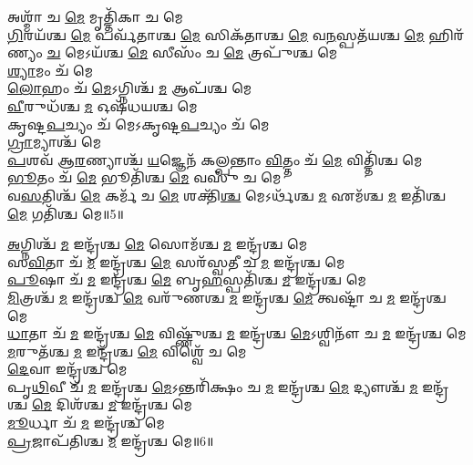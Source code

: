 𑌅𑌶𑍍𑌮𑌾᳴ 𑌚 \ul{𑌮𑍇} 𑌮𑍃𑌤𑍍𑌤𑌿᳴𑌕𑌾 𑌚 𑌮𑍇\\
\-\ul{𑌗𑌿}\-𑌰𑌯᳴𑌶𑍍𑌚 \ul{𑌮𑍇} 𑌪𑌰𑍍𑌵᳴𑌤𑌾𑌶𑍍𑌚 \ul{𑌮𑍇} 𑌸𑌿𑌕᳴𑌤𑌾𑌶𑍍𑌚 \ul{𑌮𑍇} 𑌵\-\ul{𑌨}\-𑌸𑍍𑌪𑌤᳴𑌯𑌶𑍍𑌚 \ul{𑌮𑍇} 𑌹𑌿𑌰᳴𑌣𑍍𑌯𑌂 \ul{𑌚} 𑌮𑍇𑌽𑌯᳴𑌶𑍍𑌚 \ul{𑌮𑍇} 𑌸𑍀𑌸𑌂᳴ 𑌚 \ul{𑌮𑍇} 𑌤𑍍𑌰𑌪𑍁᳴𑌶𑍍𑌚 𑌮𑍇\\
\-\ul{𑌶𑍍𑌯𑌾}\-𑌮𑌂 𑌚᳴ 𑌮𑍇\\
\-\ul{𑌲𑍋}\-𑌹𑌂 𑌚᳴ \ul{𑌮𑍇}\-𑌽𑌗𑍍𑌨𑌿𑌶𑍍𑌚᳴ \ul{𑌮} 𑌆𑌪᳴𑌶𑍍𑌚 𑌮𑍇\\
\-\ul{𑌵𑍀}\-𑌰𑍁𑌧᳴𑌶𑍍𑌚 \ul{𑌮} 𑌓𑌷᳴𑌧𑌯𑌶𑍍𑌚 𑌮𑍇\\
𑌕𑍃𑌷𑍍𑌟\-\ul{𑌪}\-𑌚𑍍𑌯𑌂 𑌚᳴ 𑌮𑍇𑌽𑌕𑍃𑌷𑍍𑌟\-\ul{𑌪}\-𑌚𑍍𑌯𑌂 𑌚᳴ 𑌮𑍇\\
\-\ul{𑌗𑍍𑌰𑌾}\-𑌮𑍍𑌯𑌾𑌶𑍍𑌚᳴ 𑌮𑍇\\
\-\ul{𑌪}\-𑌶𑌵᳴ 𑌆\-\ul{𑌰}\-𑌣𑍍𑌯𑌾𑌶𑍍𑌚᳴ \ul{𑌯}\-𑌜𑍍𑌞𑍇𑌨᳴ 𑌕𑌲𑍍𑌪𑌨𑍍𑌤𑌾𑌂 \ul{𑌵𑌿}\-𑌤𑍍𑌤𑌂 𑌚᳴ \ul{𑌮𑍇} 𑌵𑌿𑌤𑍍𑌤𑌿᳴𑌶𑍍𑌚 𑌮𑍇\\
\-\ul{𑌭𑍂}\-𑌤𑌂 𑌚᳴ \ul{𑌮𑍇} 𑌭𑍂𑌤𑌿᳴𑌶𑍍𑌚 \ul{𑌮𑍇} 𑌵𑌸𑍁᳴ 𑌚 𑌮𑍇\\
𑌵\-\ul{𑌸}\-𑌤𑌿𑌶𑍍𑌚᳴ \ul{𑌮𑍇} 𑌕𑌰𑍍𑌮᳴ 𑌚 \ul{𑌮𑍇} 𑌶𑌕𑍍𑌤𑌿᳴\-\ul{𑌶𑍍𑌚} 𑌮𑍇𑌽𑌰𑍍𑌥᳴𑌶𑍍𑌚 \ul{𑌮} 𑌏𑌮᳴𑌶𑍍𑌚 \ul{𑌮} 𑌇𑌤𑌿᳴𑌶𑍍𑌚 \ul{𑌮𑍇} 𑌗𑌤𑌿᳴𑌶𑍍𑌚 𑌮𑍇॥5॥ 

\-\ul{𑌅}\-𑌗𑍍𑌨𑌿𑌶𑍍𑌚᳴ \ul{𑌮} 𑌇𑌨𑍍𑌦𑍍𑌰᳴𑌶𑍍𑌚 \ul{𑌮𑍇} 𑌸𑍋𑌮᳴𑌶𑍍𑌚 \ul{𑌮} 𑌇𑌨𑍍𑌦𑍍𑌰᳴𑌶𑍍𑌚 𑌮𑍇\\
𑌸\-\ul{𑌵𑌿}\-𑌤𑌾 𑌚᳴ \ul{𑌮} 𑌇𑌨𑍍𑌦𑍍𑌰᳴𑌶𑍍𑌚 \ul{𑌮𑍇} 𑌸𑌰᳴𑌸𑍍𑌵𑌤𑍀 𑌚 \ul{𑌮} 𑌇𑌨𑍍𑌦𑍍𑌰᳴𑌶𑍍𑌚 𑌮𑍇\\
\-\ul{𑌪𑍂}\-𑌷𑌾 𑌚᳴ \ul{𑌮} 𑌇𑌨𑍍𑌦𑍍𑌰᳴𑌶𑍍𑌚 \ul{𑌮𑍇} 𑌬𑍃\-\ul{𑌹}\-𑌸𑍍𑌪𑌤𑌿᳴𑌶𑍍𑌚 \ul{𑌮} 𑌇𑌨𑍍𑌦𑍍𑌰᳴𑌶𑍍𑌚 𑌮𑍇\\
\-\ul{𑌮𑌿}\-𑌤𑍍𑌰𑌶𑍍𑌚᳴ \ul{𑌮} 𑌇𑌨𑍍𑌦𑍍𑌰᳴𑌶𑍍𑌚 \ul{𑌮𑍇} 𑌵𑌰𑍁᳴𑌣𑌶𑍍𑌚 \ul{𑌮} 𑌇𑌨𑍍𑌦𑍍𑌰᳴𑌶𑍍𑌚 \ul{𑌮𑍇} 𑌤𑍍𑌵𑌷𑍍𑌟𑌾᳴ 𑌚 \ul{𑌮} 𑌇𑌨𑍍𑌦𑍍𑌰᳴𑌶𑍍𑌚 𑌮𑍇\\
\-\ul{𑌧𑌾}\-𑌤𑌾 𑌚᳴ \ul{𑌮} 𑌇𑌨𑍍𑌦𑍍𑌰᳴𑌶𑍍𑌚 \ul{𑌮𑍇} 𑌵𑌿𑌷𑍍𑌣𑍁᳴𑌶𑍍𑌚 \ul{𑌮} 𑌇𑌨𑍍𑌦𑍍𑌰᳴𑌶𑍍𑌚 \ul{𑌮𑍇}\-𑌽𑌶𑍍𑌵𑌿𑌨𑍗᳴ 𑌚 \ul{𑌮} 𑌇𑌨𑍍𑌦𑍍𑌰᳴𑌶𑍍𑌚 𑌮𑍇\\
\-\ul{𑌮}\-𑌰𑍁𑌤᳴𑌶𑍍𑌚 \ul{𑌮} 𑌇𑌨𑍍𑌦𑍍𑌰᳴𑌶𑍍𑌚 \ul{𑌮𑍇} 𑌵𑌿𑌶𑍍𑌵𑍇᳴ 𑌚 𑌮𑍇\\
\-\ul{𑌦𑍇}\-𑌵𑌾 𑌇𑌨𑍍𑌦𑍍𑌰᳴𑌶𑍍𑌚 𑌮𑍇\\
𑌪𑍃\-\ul{𑌥𑌿}\-𑌵𑍀 𑌚᳴ \ul{𑌮} 𑌇𑌨𑍍𑌦𑍍𑌰᳴𑌶𑍍𑌚 \ul{𑌮𑍇}\-𑌽𑌨𑍍𑌤𑌰𑌿᳴𑌕𑍍𑌷𑌂 𑌚 \ul{𑌮} 𑌇𑌨𑍍𑌦𑍍𑌰᳴𑌶𑍍𑌚 \ul{𑌮𑍇} 𑌦𑍍𑌯𑍗𑌶𑍍𑌚᳴ \ul{𑌮} 𑌇𑌨𑍍𑌦𑍍𑌰᳴𑌶𑍍𑌚 \ul{𑌮𑍇} 𑌦𑌿𑌶᳴𑌶𑍍𑌚 \ul{𑌮} 𑌇𑌨𑍍𑌦𑍍𑌰᳴𑌶𑍍𑌚 𑌮𑍇\\
\-\ul{𑌮𑍂}\-𑌰𑍍𑌧𑌾 𑌚᳴ \ul{𑌮} 𑌇𑌨𑍍𑌦𑍍𑌰᳴𑌶𑍍𑌚 𑌮𑍇\\
\-\ul{𑌪𑍍𑌰}\-𑌜𑌾𑌪᳴𑌤𑌿𑌶𑍍𑌚 \ul{𑌮} 𑌇𑌨𑍍𑌦𑍍𑌰᳴𑌶𑍍𑌚 𑌮𑍇॥6॥ 

